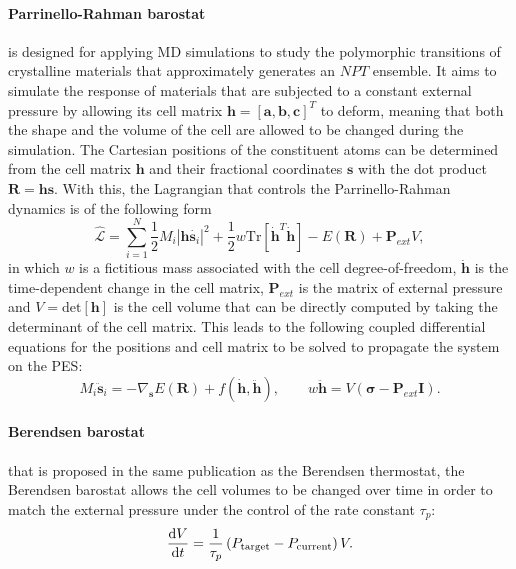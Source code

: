 \paragraph{\textbf{Parrinello-Rahman barostat}} is designed for applying MD simulations to study the polymorphic transitions of crystalline materials that approximately generates an $NPT$ ensemble.\cite{parrinello1980crystal,parrinello1981polymorphic} It aims to simulate the response of materials that are subjected to a constant external pressure by allowing its cell matrix $\mathbf{h}=[\bm{a},\bm{b},\bm{c}]^{T}$ to deform, meaning that both the shape and the volume of the cell are allowed to be changed during the simulation. The Cartesian positions of the constituent atoms can be determined from the cell matrix $\textbf{h}$ and their fractional coordinates $\bm{s}$ with the dot product $\bm{R}=\textbf{h}\bm{s}$. With this, the Lagrangian that controls the Parrinello-Rahman dynamics is of the following form
\begin{equation}
    \label{eq:parrinello-rahman-dynamic}
    \hat{\mathcal{L}}=\sum_{i=1}^{N}\frac{1}{2}M_i\left\vert \textbf{h}\dot{\bm{s}_i}\right\vert^2+\frac{1}{2}w\mbox{Tr}\left[\dot{\textbf{h}}^{T}\dot{\textbf{h}}\right]-E(\bm{R})+\textbf{P}_{ext}V,
\end{equation}
in which $w$ is a fictitious mass associated with the cell degree-of-freedom, $\dot{\textbf{h}}$ is the time-dependent change in the cell matrix,  $\textbf{P}_{ext}$ is the matrix of external pressure and $V=\mbox{det}[\textbf{h}]$ is the cell volume that can be directly computed by taking the determinant of the cell matrix. This leads to the following coupled differential equations for the positions and cell matrix to be solved to propagate the system on the PES:
\begin{equation}
    \label{eq:PR_barostat_coupled_ODE}
    M_{i}\ddot{\bm{s}}_i=-\nabla_{\bm{s}}E(\bm{R})+f(\dot{\textbf{h}},\ddot{\textbf{h}}),\qquad  w\ddot{\textbf{h}}=V(\bm{\sigma}-\textbf{P}_{ext}\textbf{I}).
\end{equation}

\paragraph{\textbf{Berendsen barostat}} that is proposed in the same publication as the Berendsen thermostat,\cite{berendsen1984molecular} the Berendsen barostat allows the cell volumes to be changed over time in order to match  the external pressure under the control of the rate constant $\tau_p$:
\begin{equation}
    \label{eq:berendsen_barostat}
    \frac{\mathrm{d}V}{\mathrm{d}t}=\frac{1}{\tau_p}\left(P_{\mbox{\scriptsize{target}}}-P_{\mbox{\scriptsize{current}}} \right)V.
\end{equation}

